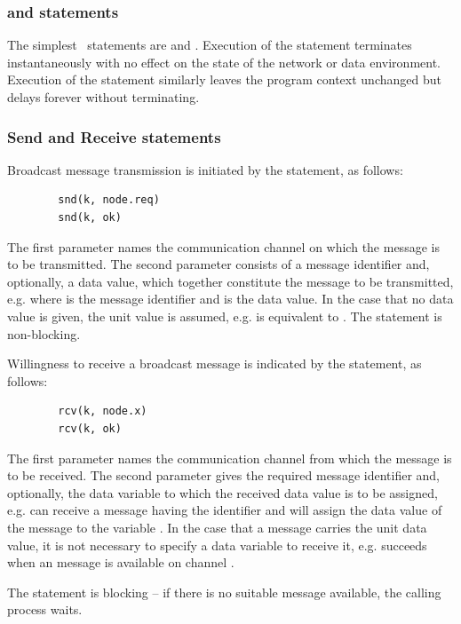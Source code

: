 \subsubsection{ and  statements}
The simplest \candle\ statements are  and .
Execution of the  statement terminates instantaneously with no 
effect on the state of the network or data environment.
Execution of the  statement similarly leaves the program context
unchanged but delays forever without terminating.
 
\subsubsection{Send and Receive statements}
Broadcast message transmission is initiated by the
 statement, as follows:
\begin{verbatim}
        snd(k, node.req)
        snd(k, ok)
\end{verbatim}
The first parameter names the communication channel on which the message
is to be transmitted. The second parameter consists of a message identifier
and, optionally, a data value, which together constitute the message
to be transmitted, e.g.  where  is
the message identifier and  is the data value. In the case that
no data value is given, the unit value is assumed, e.g. 
is equivalent to . The  statement
is non-blocking.

Willingness to receive a broadcast message is indicated by the
 statement, as follows:
\begin{verbatim}
        rcv(k, node.x)
        rcv(k, ok)
\end{verbatim}
The first parameter names the communication channel from which the
message is to be received. The second parameter gives the required
message identifier and, optionally, the data variable to which the
received data value is to be assigned, e.g.  
can receive a message having the identifier  and will
assign the data value of the message to the variable .
In the case that a message carries the unit data value, it is not
necessary to specify a data variable to receive it, e.g. 
 succeeds when an  message is
available on channel . 

The  statement is blocking -- if there is no suitable message
available, the calling process waits.

